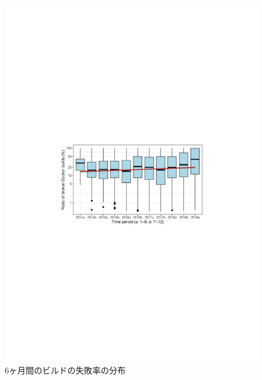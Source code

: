 \begin{figure}[t]
    \centering
    \includegraphics[width=0.9\linewidth, angle=0]{./thesis3/docker-build-failuer-ratio-period3.pdf}
    \caption{6ヶ月間のビルドの失敗率の分布}
    \label{fig:3_docker-build-failer-ratio-period}
\end{figure}

